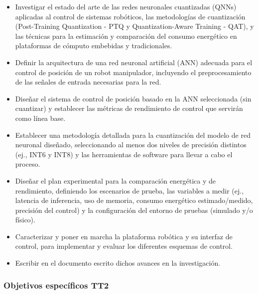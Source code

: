 \documentclass[12pt]{article}
\begin{document}
\begin{itemize}
    \item Investigar el estado del arte de las redes neuronales cuantizadas (QNNs) aplicadas al control de sistemas robóticos, las metodologías de cuantización (Post-Training Quantization - PTQ y Quantization-Aware Training - QAT), y las técnicas para la estimación y comparación del consumo energético en plataformas de cómputo embebidas y tradicionales.
    \item Definir la arquitectura de una red neuronal artificial (ANN) adecuada para el control de posición de un robot manipulador, incluyendo el preprocesamiento de las señales de entrada necesarias para la red.
    \item Diseñar el sistema de control de posición basado en la ANN seleccionada (sin cuantizar) y establecer las métricas de rendimiento de control que servirán como línea base.
    \item Establecer una metodología detallada para la cuantización del modelo de red neuronal diseñado, seleccionando al menos dos niveles de precisión distintos (ej., INT6 y INT8) y las herramientas de software para llevar a cabo el proceso. 
    \item Diseñar el plan experimental para la comparación energética y de rendimiento, definiendo los escenarios de prueba, las variables a medir (ej., latencia de inferencia, uso de memoria, consumo energético estimado/medido, precisión del control) y la configuración del entorno de pruebas (simulado y/o físico).
    \item Caracterizar y poner en marcha la plataforma robótica y su interfaz de control, para implementar y evaluar los diferentes esquemas de control.
    \item Escribir en el documento escrito dichos avances en la investigación.
\end{itemize}

\subsubsection*{Objetivos específicos TT2}
 
\end{document}

